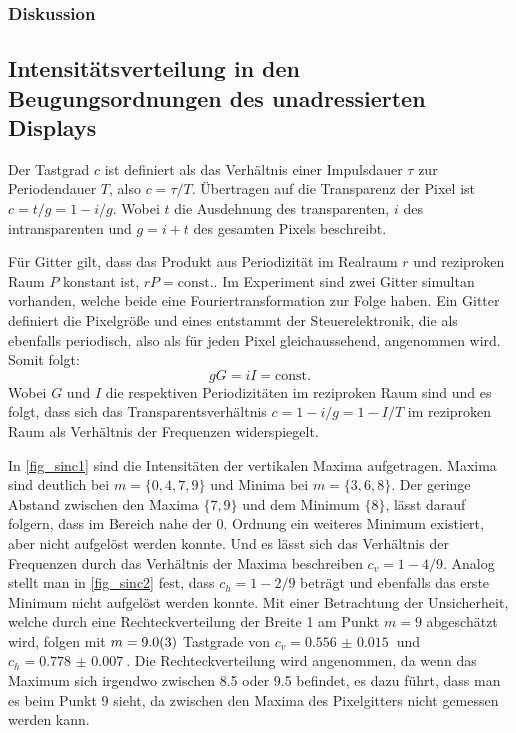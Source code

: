 \documentclass[
	a4paper,
	12pt,
	pagesize,
	ngerman
]{scrartcl}
\begin{document}
					\subsubsection*{Diskussion}

		\subsection{Intensitätsverteilung in den Beugungsordnungen des unadressierten Displays}


		Der Tastgrad $c$ ist definiert als das Verhältnis einer Impulsdauer $\tau$ zur Periodendauer $T$, also $c=\tau/T$.
		Übertragen auf die Transparenz der Pixel ist $c=t/g=1-i/g$.
		Wobei $t$ die Ausdehnung des transparenten, $i$ des intransparenten und $g=i+t$ des gesamten Pixels beschreibt.


		Für Gitter gilt, dass das Produkt aus Periodizität im Realraum $r$ und reziproken Raum $P$ konstant ist, $rP=\text{const.}$.
		Im Experiment sind zwei Gitter simultan vorhanden, welche beide eine Fouriertransformation zur Folge haben.
		Ein Gitter definiert die Pixelgröße und eines entstammt der Steuerelektronik, die als ebenfalls periodisch, also als für jeden Pixel gleichaussehend, angenommen wird.
		Somit folgt:
		\begin{equation}
			gG =iI = \text{const.}
		\end{equation}
		Wobei $G$ und $I$ die respektiven Periodizitäten im reziproken Raum sind und es folgt, dass sich das Transparentsverhältnis $c=1-i/g=1-I/T$ im reziproken Raum als Verhältnis der Frequenzen widerspiegelt.

		In \cref{fig_sinc1} sind die Intensitäten der vertikalen Maxima aufgetragen.
		Maxima sind deutlich bei $m=\{0,4,7,9\}$ und Minima bei $m=\{3,6,8\}$.
		Der geringe Abstand zwischen den Maxima $\{7,9\}$ und dem Minimum $\{8\}$, lässt darauf folgern, dass im Bereich nahe der 0. Ordnung ein weiteres Minimum existiert, aber nicht aufgelöst werden konnte.
		Und es lässt sich das Verhältnis der Frequenzen durch das Verhältnis der Maxima beschreiben $c_v=1-4/9$.
		Analog stellt man in \cref{fig_sinc2} fest, dass $c_h=1-2/9$ beträgt und ebenfalls das erste Minimum nicht aufgelöst werden konnte.
		Mit einer Betrachtung der Unsicherheit, welche durch eine Rechteckverteilung der Breite 1 am Punkt $m=9$ abgeschätzt wird, folgen mit $m=\SI{9+-0.3}{}$ Tastgrade von $c_v=\SI{0.556(15)}{}$ und $c_h=\SI{0.778(7)}{}$.
		Die Rechteckverteilung wird angenommen, da wenn das Maximum sich irgendwo zwischen \num{8,5} oder \num{9,5} befindet, es dazu führt, dass man es beim Punkt \num{9} sieht, da zwischen den Maxima des Pixelgitters nicht gemessen werden kann.
\end{document}
